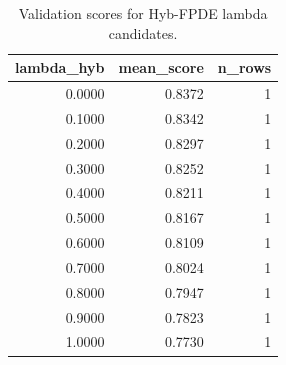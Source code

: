 \begin{table}[t]
\caption{Validation scores for Hyb-FPDE lambda candidates.}
\label{tab:lambda_distribution_computed}
\centering
\begin{tabular}{rrr}
\toprule
lambda\_hyb & mean\_score & n\_rows \\
\midrule
0.0000 & 0.8372 & 1 \\
0.1000 & 0.8342 & 1 \\
0.2000 & 0.8297 & 1 \\
0.3000 & 0.8252 & 1 \\
0.4000 & 0.8211 & 1 \\
0.5000 & 0.8167 & 1 \\
0.6000 & 0.8109 & 1 \\
0.7000 & 0.8024 & 1 \\
0.8000 & 0.7947 & 1 \\
0.9000 & 0.7823 & 1 \\
1.0000 & 0.7730 & 1 \\
\bottomrule
\end{tabular}

\end{table}

